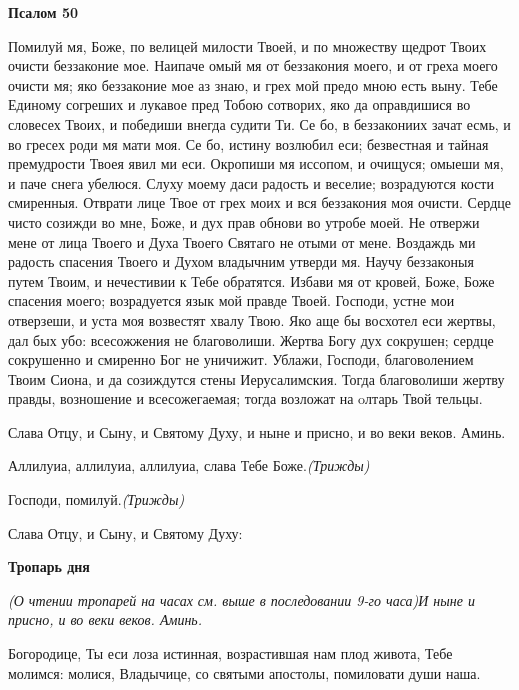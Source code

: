 \medskip
\bfseries Псалом 50\normalfont{}



Помилуй мя, Боже, по велицей милости Твоей, и по множеству щедрот Твоих очисти беззаконие мое. Наипаче омый мя от беззакония моего, и от греха моего очисти мя; яко беззаконие мое аз знаю, и грех мой предо мною есть выну. Тебе Единому согреших и лукавое пред Тобою сотворих, яко да оправдишися во словесех Твоих, и победиши внегда судити Ти. Се бо, в беззакониих зачат есмь, и во гресех роди мя мати моя. Се бо, истину возлюбил еси; безвестная и тайная премудрости Твоея явил ми еси. Окропиши мя иссопом, и очищуся; омыеши мя, и паче снега убелюся. Слуху моему даси радость и веселие; возрадуются кости смиренныя. Отврати лице Твое от грех моих и вся беззакония моя очисти. Сердце чисто созижди во мне, Боже, и дух прав обнови во утробе моей. Не отвержи мене от лица Твоего и Духа Твоего Святаго не отыми от мене. Воздаждь ми радость спасения Твоего и Духом владычним утверди мя. Научу беззаконыя путем Твоим, и нечестивии к Тебе обратятся. Избави мя от кровей, Боже, Боже спасения моего; возрадуется язык мой правде Твоей. Господи, устне мои отверзеши, и уста моя возвестят хвалу Твою. Яко аще бы восхотел еси жертвы, дал бых убо: всесожжения не благоволиши. Жертва Богу дух сокрушен; сердце сокрушенно и смиренно Бог не уничижит. Ублажи, Господи, благоволением Твоим Сиона, и да созиждутся стены Иерусалимския. Тогда благоволиши жертву правды, возношение и всесожегаемая; тогда возложат на oлтарь Твой тельцы.









Слава Отцу, и Сыну, и Святому Духу, и ныне и присно, и во веки веков. Аминь.



Аллилуиа, аллилуиа, аллилуиа, слава Тебе Боже.\itshape  (Трижды)\normalfont{}



Господи, помилуй.\itshape  (Трижды)\normalfont{}



Слава Отцу, и Сыну, и Святому Духу:


\medskip
\bfseries Тропарь дня\normalfont{}


\itshape (О чтении тропарей на часах см. выше в последовании 9-го часа)\normalfont{}И ныне и присно, и во веки веков. Аминь.



Богородице, Ты еси лоза истинная, возрастившая нам плод живота, Тебе молимся: молися, Владычице, со святыми апостолы, помиловати души наша.



